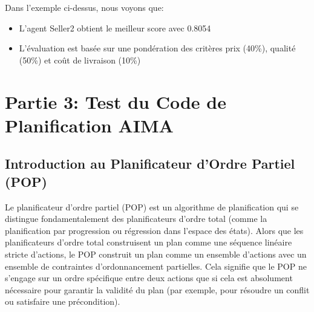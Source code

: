 \documentclass[a4paper,12pt]{report}
\begin{document}
Dans l'exemple ci-dessus, nous voyons que:
\begin{itemize}
    \item L'agent Seller2 obtient le meilleur score avec 0.8054
    \item L'évaluation est basée sur une pondération des critères prix (40\%), qualité (50\%) et coût de livraison (10\%)
\end{itemize}

\chapter{Partie 3: Test du Code de Planification AIMA}

\section{Introduction au Planificateur d'Ordre Partiel (POP)}
Le planificateur d'ordre partiel (POP) est un algorithme de planification qui se distingue fondamentalement des planificateurs d'ordre total (comme la planification par progression ou régression dans l'espace des états). Alors que les planificateurs d'ordre total construisent un plan comme une séquence linéaire stricte d'actions, le POP construit un plan comme un ensemble d'actions avec un ensemble de contraintes d'ordonnancement partielles. Cela signifie que le POP ne s'engage sur un ordre spécifique entre deux actions que si cela est absolument nécessaire pour garantir la validité du plan (par exemple, pour résoudre un conflit ou satisfaire une précondition).
\end{document}
